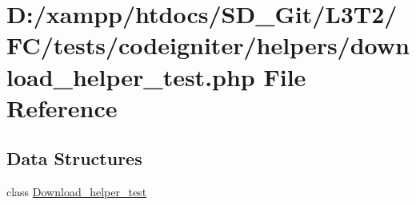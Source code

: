 \hypertarget{tests_2codeigniter_2helpers_2download__helper__test_8php}{}\section{D\+:/xampp/htdocs/\+S\+D\+\_\+\+Git/\+L3\+T2/\+F\+C/tests/codeigniter/helpers/download\+\_\+helper\+\_\+test.php File Reference}
\label{tests_2codeigniter_2helpers_2download__helper__test_8php}
\subsection*{Data Structures}
\begin{DoxyCompactItemize}
\item 
class \hyperlink{class_download__helper__test}{Download\+\_\+helper\+\_\+test}
\end{DoxyCompactItemize}
